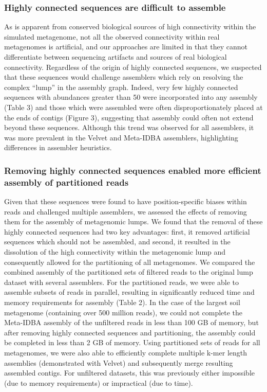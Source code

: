 \documentclass[10pt]{article}
\begin{document}
\subsubsection*{Highly connected sequences are difficult to assemble}
As is apparent from conserved biological sources of high connectivity
within the simulated metagenome, not all the observed connectivity
within real metagenomes is artificial, and our approaches are limited
in that they cannot differentiate between sequencing artifacts and
sources of real biological connectivity.  Regardless of the origin of
highly connected sequences, we suspected that these sequences would
challenge assemblers which rely on resolving the complex ``lump'' in
the assembly graph.  Indeed, very few highly connected sequences with
abundances greater than 50 were incorporated into any assembly (Table
3) and those which were assembled were often disproportionately placed
at the ends of contigs (Figure 3), suggesting that assembly could
often not extend beyond these sequences.  Although this trend was
observed for all assemblers, it was more prevalent in the Velvet and
Meta-IDBA assemblers, highlighting differences in assembler
heuristics.

\subsubsection*{Removing highly connected sequences enabled more efficient assembly of partitioned reads}
Given that these sequences were found to have position-specific biases
within reads and challenged multiple assemblers, we assessed the
effects of removing them for the assembly of metagenomic lumps.  We
found that the removal of these highly connected sequences had two key
advantages: first, it removed artificial sequences which should not be
assembled, and second, it resulted in the dissolution of the high
connectivity within the metagenomic lump and consequently allowed for
the partitioning of all metagenomes.  We compared the combined
assembly of the partitioned sets of filtered reads to the original
lump dataset with several assemblers.  For the partitioned reads, we
were able to assemble subsets of reads in parallel, resulting in
significantly reduced time and memory requirements for assembly (Table
2).  In the case of the largest soil metagenome (containing over 500
million reads), we could not complete the Meta-IDBA assembly of the
unfiltered reads in less than 100 GB of memory, but after removing
highly connected sequences and partitioning, the assembly could be
completed in less than 2 GB of memory.  Using partitioned sets of
reads for all metagenomes, we were also able to efficiently complete
multiple k-mer length assemblies (demonstrated with Velvet) and
subsequently merge resulting assembled contigs.  For unfiltered
datasets, this was previously either impossible (due to memory
requirements) or impractical (due to time).
\end{document}
